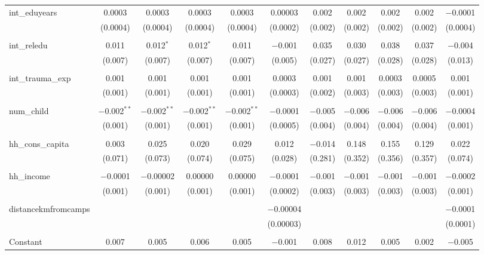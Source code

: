 \begin{table}[H]
\begin{tabular}{@{\extracolsep{4pt}}lcccccccccc}
 int\_eduyears & 0.0003 & 0.0003 & 0.0003 & 0.0003 & 0.00003 & 0.002 & 0.002 & 0.002 & 0.002 & $-$0.0001 \\ 
  & (0.0004) & (0.0004) & (0.0004) & (0.0004) & (0.0002) & (0.002) & (0.002) & (0.002) & (0.002) & (0.0004) \\ 
  & & & & & & & & & & \\ 
 int\_reledu & 0.011 & 0.012$^{*}$ & 0.012$^{*}$ & 0.011 & $-$0.001 & 0.035 & 0.030 & 0.038 & 0.037 & $-$0.004 \\ 
  & (0.007) & (0.007) & (0.007) & (0.007) & (0.005) & (0.027) & (0.027) & (0.028) & (0.028) & (0.013) \\ 
  & & & & & & & & & & \\ 
 int\_trauma\_exp & 0.001 & 0.001 & 0.001 & 0.001 & 0.0003 & 0.001 & 0.001 & 0.0003 & 0.0005 & 0.001 \\ 
  & (0.001) & (0.001) & (0.001) & (0.001) & (0.0003) & (0.002) & (0.003) & (0.003) & (0.003) & (0.001) \\ 
  & & & & & & & & & & \\ 
 num\_child & $-$0.002$^{**}$ & $-$0.002$^{**}$ & $-$0.002$^{**}$ & $-$0.002$^{**}$ & $-$0.0001 & $-$0.005 & $-$0.006 & $-$0.006 & $-$0.006 & $-$0.0004 \\ 
  & (0.001) & (0.001) & (0.001) & (0.001) & (0.0005) & (0.004) & (0.004) & (0.004) & (0.004) & (0.001) \\ 
  & & & & & & & & & & \\ 
 hh\_cons\_capita & 0.003 & 0.025 & 0.020 & 0.029 & 0.012 & $-$0.014 & 0.148 & 0.155 & 0.129 & 0.022 \\ 
  & (0.071) & (0.073) & (0.074) & (0.075) & (0.028) & (0.281) & (0.352) & (0.356) & (0.357) & (0.074) \\ 
  & & & & & & & & & & \\ 
 hh\_income & $-$0.0001 & $-$0.00002 & 0.00000 & 0.00000 & $-$0.0001 & $-$0.001 & $-$0.001 & $-$0.001 & $-$0.001 & $-$0.0002 \\ 
  & (0.001) & (0.001) & (0.001) & (0.001) & (0.0002) & (0.003) & (0.003) & (0.003) & (0.003) & (0.001) \\ 
  & & & & & & & & & & \\ 
 distancekmfromcamps &  &  &  &  & $-$0.00004 &  &  &  &  & $-$0.0001 \\ 
  &  &  &  &  & (0.00003) &  &  &  &  & (0.0001) \\ 
  & & & & & & & & & & \\ 
 Constant & 0.007 & 0.005 & 0.006 & 0.005 & $-$0.001 & 0.008 & 0.012 & 0.005 & 0.002 & $-$0.005 \\ 

\end{tabular}
\end{table}
